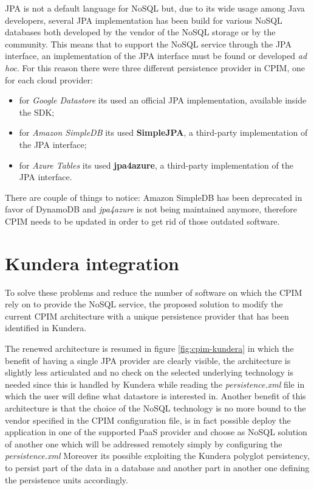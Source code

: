 \newparagraph JPA is not a default language for NoSQL but, due to its wide usage among Java developers, several JPA implementation has been build for various NoSQL databases both developed by the vendor of the NoSQL storage or by the community.
This means that to support the NoSQL service through the JPA interface, an implementation of the JPA interface must be found or developed \textit{ad hoc}. For this reason there were three different persistence provider in CPIM, one for each cloud provider:
\begin{itemize}
\item for \textit{Google Datastore} its used an official JPA implementation, available inside the SDK;
\item for \textit{Amazon SimpleDB} its used \textbf{SimpleJPA}, a third-party implementation of the JPA interface;
\item for \textit{Azure Tables} its used \textbf{jpa4azure}, a third-party implementation of the JPA interface.
\end{itemize}

\noindent There are couple of things to notice: Amazon SimpleDB has been deprecated in favor of DynamoDB and \textit{jpa4azure} is not being maintained anymore, therefore CPIM needs to be updated in order to get rid of those outdated software.

\section{Kundera integration}
\label{sec:kundera-integration}
To solve these problems and reduce the number of software on which the CPIM rely on to provide the NoSQL service, the proposed solution  to modify the current CPIM architecture with a unique persistence provider that has been identified in Kundera.

\newparagraph The renewed architecture is resumed in figure \ref{fig:cpim-kundera} in which the benefit of having a single JPA provider are clearly visible, the architecture is slightly less articulated and no check on the selected underlying technology is needed since this is handled by Kundera while reading the \textit{persistence.xml} file in which the user will define what datastore is interested in.
Another benefit of this architecture is that the choice of the NoSQL technology is no more bound to the vendor specified in the CPIM configuration file, is in fact possible deploy the application in one of the supported PaaS provider and choose as NoSQL solution of another one which will be addressed remotely simply by configuring the \textit{persistence.xml} Moreover its possible exploiting the Kundera polyglot persistency, to persist part of the data in a database and another part in another one defining the persistence units accordingly.

